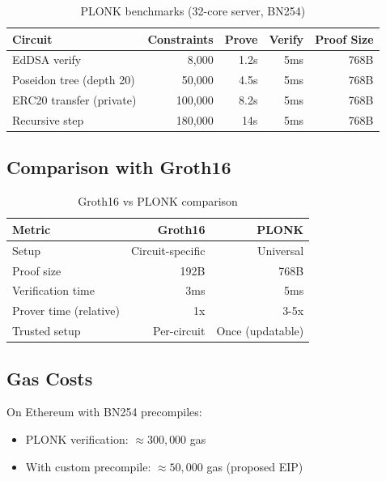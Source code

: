 \documentclass[11pt,a4paper]{article}
\begin{document}
\begin{table}[h]
\centering
\begin{tabular}{lrrrr}
\toprule
\textbf{Circuit} & \textbf{Constraints} & \textbf{Prove} & \textbf{Verify} & \textbf{Proof Size} \\
\midrule
EdDSA verify & 8,000 & 1.2s & 5ms & 768B \\
Poseidon tree (depth 20) & 50,000 & 4.5s & 5ms & 768B \\
ERC20 transfer (private) & 100,000 & 8.2s & 5ms & 768B \\
Recursive step & 180,000 & 14s & 5ms & 768B \\
\bottomrule
\end{tabular}
\caption{PLONK benchmarks (32-core server, BN254)}
\label{tab:plonk-benchmarks}
\end{table}

\subsection{Comparison with Groth16}

\begin{table}[h]
\centering
\begin{tabular}{lrr}
\toprule
\textbf{Metric} & \textbf{Groth16} & \textbf{PLONK} \\
\midrule
Setup & Circuit-specific & Universal \\
Proof size & 192B & 768B \\
Verification time & 3ms & 5ms \\
Prover time (relative) & 1x & 3-5x \\
Trusted setup & Per-circuit & Once (updatable) \\
\bottomrule
\end{tabular}
\caption{Groth16 vs PLONK comparison}
\label{tab:comparison}
\end{table}

\subsection{Gas Costs}

On Ethereum with BN254 precompiles:

\begin{itemize}
    \item PLONK verification: $\approx 300,000$ gas
    \item With custom precompile: $\approx 50,000$ gas (proposed EIP)
\end{itemize}
\end{document}
